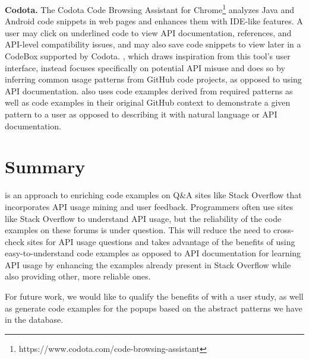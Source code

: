 {\bf Codota.} The Codota Code Browsing Assistant for Chrome\footnote{https://www.codota.com/code-browsing-assistant} analyzes Java and Android code snippets in web pages and enhances them with IDE-like features. A user may click on underlined code to view API documentation, references, and API-level compatibility issues, and may also save code snippets to view later in a CodeBox supported by Codota. {\soa}, which draws inspiration from this tool's user interface, instead focuses specifically on potential API misuse and does so by inferring common usage patterns from GitHub code projects, as opposed to using API documentation. {\soa} also uses code examples derived from required patterns as well as code examples in their original GitHub context to demonstrate a given pattern to a user as opposed to describing it with natural language or API documentation.

\section{Summary}
\label{sec:summary}

{\soa} is an approach to enriching code examples on Q\&A sites like Stack Overflow that incorporates API usage mining and user feedback. Programmers often use sites like Stack Overflow to understand API usage, but the reliability of the code examples on these forums is under question. This will reduce the need to cross-check sites for API usage questions and takes advantage of the benefits of using easy-to-understand code examples as opposed to API documentation for learning API usage by enhancing the examples already present in Stack Overflow while also providing other, more reliable ones.

For future work, we would like to qualify the benefits of {\soa} with a user study, as well as generate code examples for the popups based on the abstract patterns we have in the database.